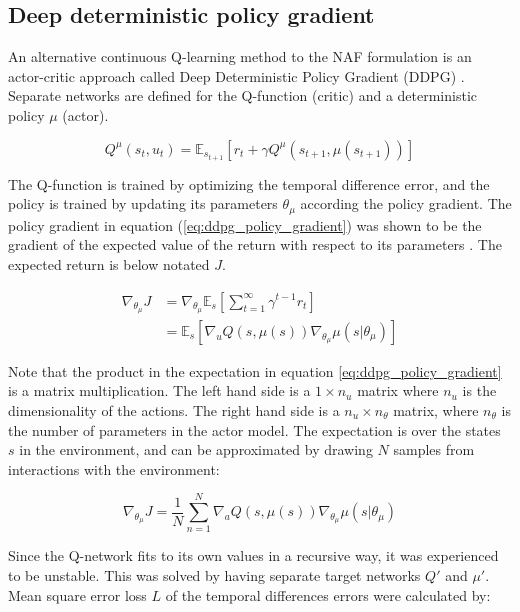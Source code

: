 \subsection{Deep deterministic policy gradient}

An alternative continuous Q-learning method to the NAF formulation is an
actor-critic approach called Deep Deterministic Policy Gradient (DDPG)
\cite{lillicrap2015continuous}. Separate networks are defined for the
Q-function (critic) and a deterministic policy $\mu$ (actor).

\begin{equation}
    Q^\mu(s_t, u_t) = \mathbb{E}_{s_{t+1}}\left[ r_t + \gamma Q^\mu(s_{t+1}, \mu (s_{t+1})) \right]
\end{equation}

The Q-function is trained by optimizing the temporal difference error, and the
policy is trained by updating its parameters $\theta_\mu$ according the policy
gradient. The policy gradient in equation (\ref{eq:ddpg_policy_gradient}) was
shown to be the gradient of the expected value of the return with respect to
its parameters \cite{lever2014deterministic}. The expected return is below
notated $J$.

\begin{align}
    \nabla_{\theta_\mu}J &= \nabla_{\theta_\mu} \mathbb{E}_s \left[\sum_{t=1}^\infty \gamma^{t - 1} r_t \right] \\
                         &= \mathbb{E}_s \left[\nabla_u Q(s, \mu(s)) \nabla_{\theta_\mu} \mu(s|\theta_\mu) \right] \label{eq:ddpg_policy_gradient}
\end{align}

Note that the product in the expectation in equation
\ref{eq:ddpg_policy_gradient} is a matrix multiplication. The left hand side is
a $1 \times n_u$ matrix where $n_u$ is the dimensionality of the actions. The
right hand side is a $n_u \times n_\theta$ matrix, where $n_\theta$ is the
number of parameters in the actor model. The expectation is over the states $s$
in the environment, and can be approximated by drawing $N$ samples from
interactions with the environment:

\begin{equation}
    \nabla_{\theta_\mu}J = \frac{1}{N} \sum_{n=1}^N \nabla_a Q(s, \mu(s)) \nabla_{\theta_\mu} \mu(s|\theta_\mu)
\end{equation}

Since the Q-network fits to its own values in a recursive way, it was
experienced to be unstable. This was solved by having separate target networks
$Q'$ and $\mu'$. Mean square error loss $\mathit{L}$ of the temporal
differences errors were calculated by:

